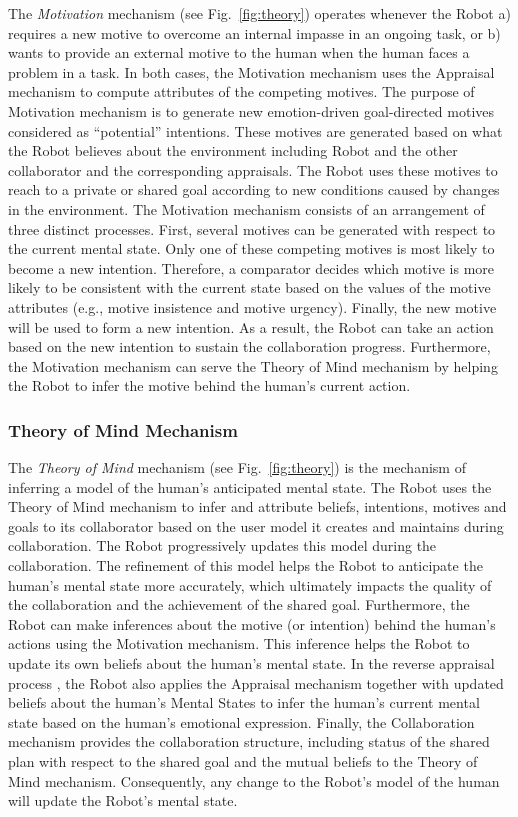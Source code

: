 The \textit{Motivation} mechanism (see Fig.~\ref{fig:theory}) operates whenever
the Robot a) requires a new motive to overcome an internal impasse in an ongoing
task, or b) wants to provide an external motive to the human when the human
faces a problem in a task. In both cases, the Motivation mechanism uses the
Appraisal mechanism to compute attributes of the competing motives. The purpose
of Motivation mechanism is to generate new emotion-driven goal-directed motives
considered as ``potential'' intentions. These motives are generated based on what
the Robot believes about the environment including Robot and the other
collaborator and the corresponding appraisals. The Robot uses these motives to
reach to a private or shared goal according to new conditions caused by changes
in the environment. The Motivation mechanism consists of an arrangement of three
distinct processes. First, several motives can be generated with respect to the
current mental state. Only one of these competing motives is most likely to
become a new intention. Therefore, a comparator decides which motive is more
likely to be consistent with the current state based on the values of the motive
attributes (e.g., motive insistence and motive urgency). Finally, the new motive
will be used to form a new intention. As a result, the Robot can take an action
based on the new intention to sustain the collaboration progress. Furthermore,
the Motivation mechanism can serve the Theory of Mind mechanism by helping the
Robot to infer the motive behind the human's current action.

\subsubsection{Theory of Mind Mechanism}
\label{sec:tom-mech}

The \textit{Theory of Mind} mechanism (see Fig.~\ref{fig:theory}) is the
mechanism of inferring a model of the human's anticipated mental state. The
Robot uses the Theory of Mind mechanism to infer and attribute beliefs,
intentions, motives and goals to its collaborator based on the user model it
creates and maintains during collaboration. The Robot progressively updates this
model during the collaboration. The refinement of this model helps the Robot to
anticipate the human's mental state more accurately, which ultimately impacts
the quality of the collaboration and the achievement of the shared goal.
Furthermore, the Robot can make inferences about the motive (or intention) behind
the human's actions using the Motivation mechanism. This inference helps the
Robot to update its own beliefs about the human's mental state. In the reverse
appraisal process \cite{gratch:reverse-appraisal}, the Robot also applies the
Appraisal mechanism together with updated beliefs about the human's Mental
States to infer the human's current mental state based on the human's emotional
expression. Finally, the Collaboration mechanism provides the collaboration
structure, including status of the shared plan with respect to the shared goal
and the mutual beliefs to the Theory of Mind mechanism. Consequently, any change
to the Robot's model of the human will update the Robot's mental state.

